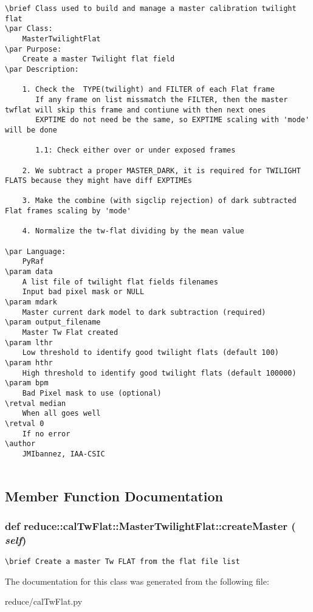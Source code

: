 \footnotesize\begin{verbatim}
\brief Class used to build and manage a master calibration twilight flat
\par Class:
    MasterTwilightFlat
\par Purpose:
    Create a master Twilight flat field
\par Description:
    
    1. Check the  TYPE(twilight) and FILTER of each Flat frame
       If any frame on list missmatch the FILTER, then the master twflat will skip this frame and contiune with then next ones
       EXPTIME do not need be the same, so EXPTIME scaling with 'mode' will be done
       
       1.1: Check either over or under exposed frames
    
    2. We subtract a proper MASTER_DARK, it is required for TWILIGHT FLATS because they might have diff EXPTIMEs
    
    3. Make the combine (with sigclip rejection) of dark subtracted Flat frames scaling by 'mode'
    
    4. Normalize the tw-flat dividing by the mean value
    
\par Language:
    PyRaf
\param data
    A list file of twilight flat fields filenames
    Input bad pixel mask or NULL
\param mdark
    Master current dark model to dark subtraction (required)
\param output_filename  
    Master Tw Flat created 
\param lthr
    Low threshold to identify good twilight flats (default 100)
\param hthr
    High threshold to identify good twilight flats (default 100000)
\param bpm
    Bad Pixel mask to use (optional)
\retval median
    When all goes well
\retval 0
    If no error
\author
    JMIbannez, IAA-CSIC
  
\end{verbatim}
\normalsize
 



\subsection{Member Function Documentation}
\subsubsection{\setlength{\rightskip}{0pt plus 5cm}def reduce::cal\-Tw\-Flat::Master\-Twilight\-Flat::create\-Master ( {\em self})}\label{classreduce_1_1calTwFlat_1_1MasterTwilightFlat_6443da04cd094b3067fceb0b5b503595}




\footnotesize\begin{verbatim}
\brief Create a master Tw FLAT from the flat file list
\end{verbatim}
\normalsize
 

The documentation for this class was generated from the following file:\begin{CompactItemize}
\item 
reduce/cal\-Tw\-Flat.py\end{CompactItemize}
